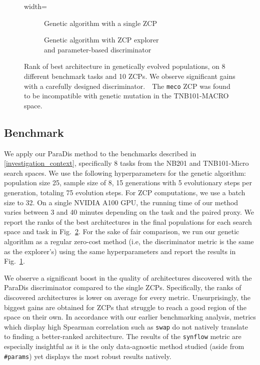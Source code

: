 \documentclass[10pt]{article} %
\begin{document}
\begin{figure}[h]
\centering
\begin{adjustbox}{width=\linewidth}
    \begin{subfigure}[t]{.51\textwidth}
        \resizebox{\textwidth}{!}{}
        \caption{\centering Genetic algorithm with a single ZCP}
        \label{fig_genetic_same}
    \end{subfigure}%
    \hfill%
    \begin{subfigure}[t]{.49\textwidth}
        \resizebox{\textwidth}{!}{}
        \caption{\centering Genetic algorithm with ZCP explorer \\
        and parameter-based discriminator}
        \label{fig_genetic_regparams}
    \end{subfigure}%
\end{adjustbox}
\caption{Rank of best architecture in genetically evolved populations, on 8 different benchmark tasks and 10 ZCPs. We observe significant gains with a carefully designed discriminator.~\dag~The \texttt{meco} ZCP was found to be incompatible with genetic mutation in the TNB101-MACRO space.}
\label{fig_genetic}
\end{figure}

\subsection{Benchmark}
\label{experiments_nbsz}

We apply our ParaDis method to the benchmarks described in \ref{investigation_context}, specifically 8 tasks from the NB201 and TNB101-Micro search spaces. We use the following hyperparameters for the genetic algorithm: population size 25, sample size of 8, 15 generations with 5 evolutionary steps per generation, totaling 75 evolution steps. For ZCP computations, we use a batch size to 32. On a single NVIDIA A100 GPU, the running time of our method varies between 3 and 40 minutes depending on the task and the paired proxy. We report the ranks of the best architectures in the final populations for each search space and task in Fig.~\ref{fig_genetic_regparams}. For the sake of fair comparison, we run our genetic algorithm as a regular zero-cost method (i.e, the discriminator metric is the same as the explorer's) using the same hyperparameters and report the results in Fig.~\ref{fig_genetic_same}.

We observe a significant boost in the quality of architectures discovered with the ParaDis discriminator compared to the single ZCPs. Specifically, the ranks of discovered architectures is lower on average for every metric. Unsurprisingly, the biggest gains are obtained for ZCPs that struggle to reach a good region of the space on their own. In accordance with our earlier benchmarking analysis, metrics which display high Spearman correlation such as \texttt{swap} do not natively translate to finding a better-ranked architecture. The results of the \texttt{synflow} metric are especially insightful as it is the only data-agnostic method studied (aside from \texttt{\#params}) yet displays the most robust results natively.
\end{document}

